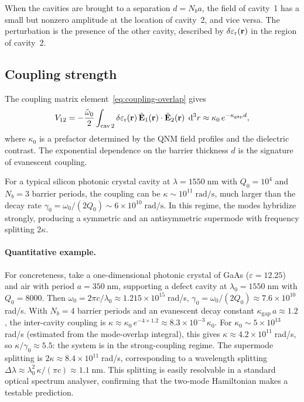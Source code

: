 When the cavities are brought to a separation $d = N_b a$, the field
of cavity~1 has a small but nonzero amplitude at the location of
cavity~2, and vice versa. The perturbation is the presence of the
other cavity, described by $\delta\varepsilon_{\mathrm{r}}(\mathbf{r})$ in the region of
cavity~2.

\subsection{Coupling strength}
\label{ssec:coupling-strength}

The coupling matrix element~\eqref{eq:coupling-overlap} gives
\begin{equation}
 V_{12} = -\frac{\tilde{\omega}_0}{2}
 \int_{\mathrm{cav\,2}} \delta\varepsilon_{\mathrm{r}}(\mathbf{r})\,
 \tilde{\mathbf{E}}_1(\mathbf{r})\cdot\tilde{\mathbf{E}}_2(\mathbf{r})\;\mathop{}\!\mathrm{d}^3r
 \approx \kappa_0\,e^{-\kappa_{\mathrm{gap}} d},
 \label{eq:two-cavity-coupling}
\end{equation}
where $\kappa_0$ is a prefactor determined by the QNM field profiles and
the dielectric contrast. The exponential dependence on the
barrier thickness $d$ is the signature of evanescent coupling.

For a typical silicon photonic crystal cavity at $\lambda = 1550\;\mathrm{nm}$
with $Q_0 = 10^4$ and $N_b = 3$ barrier periods, the coupling can be
$\kappa \sim 10^{11}\;\mathrm{rad/s}$, much larger than the decay rate
$\gamma_0 = \omega_0/(2Q_0) \sim 6 \times 10^{10}\;\mathrm{rad/s}$. In
this regime, the modes hybridize strongly, producing a symmetric and an
antisymmetric supermode with frequency splitting $2\kappa$.

\paragraph{Quantitative example.}
For concreteness, take a one-dimensional photonic crystal of GaAs
($\varepsilon = 12.25$) and air with period $a = 350\;$nm, supporting
a defect cavity at $\lambda_0 = 1550\;$nm with $Q_0 = 8000$. Then
$\omega_0 = 2\pi c/\lambda_0 \approx 1.215 \times 10^{15}\;$rad/s,
$\gamma_0 = \omega_0/(2Q_0) \approx 7.6 \times 10^{10}\;$rad/s.
With $N_b = 4$ barrier periods and an evanescent decay constant
$\kappa_{\mathrm{gap}}\,a \approx 1.2$, the inter-cavity coupling is
$\kappa \approx \kappa_0\,e^{-4 \times 1.2} \approx 8.3 \times 10^{-3}\,\kappa_0$.
For $\kappa_0 \sim 5 \times 10^{13}\;$rad/s (estimated from the
mode-overlap integral), this gives
$\kappa \approx 4.2 \times 10^{11}\;$rad/s, so
$\kappa/\gamma_0 \approx 5.5$: the system is in the strong-coupling
regime. The supermode splitting is $2\kappa \approx 8.4 \times
10^{11}\;$rad/s, corresponding to a wavelength splitting
$\Delta\lambda \approx \lambda_0^2\,\kappa/(\pi c) \approx 1.1\;$nm.
This splitting is easily resolvable in a standard optical spectrum
analyser, confirming that the two-mode Hamiltonian makes a testable
prediction.

